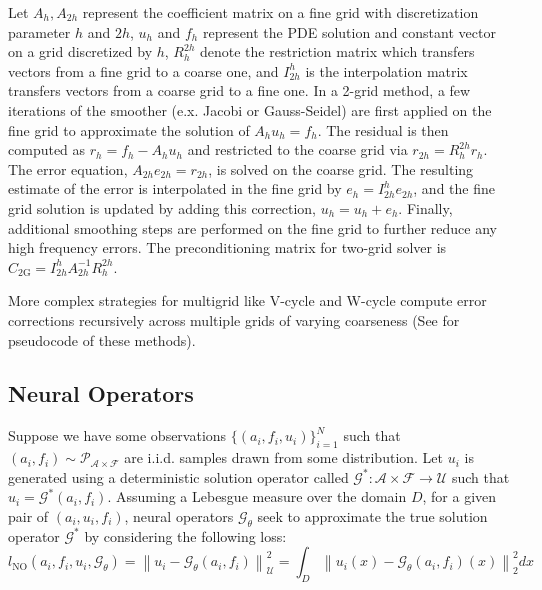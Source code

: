 \documentclass{article} %
\begin{document}
Let $A_h, A_{2h}$ represent the coefficient matrix on a fine grid with discretization parameter $h$ and $2h$, $u_h$ and $f_h$ represent the PDE solution and constant vector on a grid discretized by $h$, $R^{2h}_h$ denote the restriction matrix which transfers vectors from a fine grid to a coarse one, and $I^{h}_{2h}$ is the interpolation matrix transfers vectors from a coarse grid to a fine one. In a 2-grid method, a few iterations of the smoother (e.x. Jacobi or Gauss-Seidel) are first applied on the fine grid to approximate the solution of $A_hu_h = f_h$. The residual is then computed as $r_h = f_h - A_hu_h$ and restricted to the coarse grid via $r_{2h} = R^{2h}_hr_h$. The error equation, $A_{2h}e_{2h} = r_{2h}$, is solved on the coarse grid. The resulting estimate of the error is interpolated in the fine grid by $e_h = I^{h}_{2h}e_{2h}$, and the fine grid solution is updated by adding this correction, $u_h = u_h + e_h$. Finally, additional smoothing steps are performed on the fine grid to further reduce any high frequency errors. The preconditioning matrix for two-grid solver is $C_\mathrm{2G} = I^{h}_{2h}A_{2h}^{-1}R^{2h}_h$.

More complex strategies for multigrid like V-cycle and W-cycle compute error corrections recursively across multiple grids of varying coarseness (See  for pseudocode of these methods).

\subsection{Neural Operators} \label{sec:neuraloperators}

Suppose we have some observations $\{(a_i, f_i, u_i)\}_{i = 1}^N$ such that $(a_i, f_i) \sim \mathcal{P}_{\mathcal{A} \times \mathcal{F}}$ are i.i.d. samples drawn from some distribution. Let $u_i$ is generated using a deterministic solution operator called $\mathcal{G}^{*} : \mathcal{A} \times \mathcal{F} \to \mathcal{U}$ such that $u_i = \mathcal{G}^{*}(a_i, f_i)$. Assuming a Lebesgue measure over the domain $D$, for a given pair of $(a_i, u_i, f_i)$, neural operators  $\mathcal{G}_{\theta}$ seek to approximate the true solution operator $\mathcal{G}^*$ by considering the following loss:
\begin{equation} \label{eq:NOloss}
    l_{\text{NO}}(a_i, f_i, u_i, \mathcal{G}_{\theta}) = \left\|u_i - \mathcal{G}_{\theta}(a_i, f_i)\right\|^2_{\mathcal{U}} = \int_{D} \left\|u_i(x) - \mathcal{G}_{\theta}(a_i, f_i)(x)\right\|_2^2dx
\end{equation}
\end{document}
